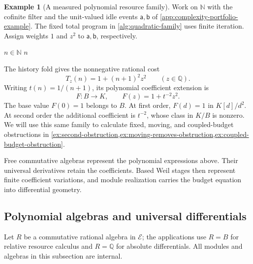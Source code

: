 \documentclass[11pt,a4paper]{article}
\numberwithin{algorithm}{section}
\numberwithin{equation}{section}
\theoremstyle{definition}
\newtheorem{example}[example]{Example}
\theoremstyle{remark}
\theoremstyle{plain}
\newcommand{\E}{\mathcal E}
\newcommand{\N}{\mathbb N}
\newcommand{\QQ}{\mathbb Q}
\theoremstyle{definition}
\theoremstyle{plain}
\begin{document}
\begin{example}[A measured polynomial resource family]
\label{ex:weighted-resource-family}
Work on $\N$ with the cofinite filter and the unit-valued idle events
$\mathsf a,\mathsf b$ of \cref{app:complexity-portfolio-example}.
The fixed total program in \cref{alg:quadratic-family} uses finite
iteration. Assign weights $1$ and $z^2$ to $\mathsf a,\mathsf b$,
respectively.
\begin{algorithm}[H]
\caption{The measured quadratic resource family}\label{alg:quadratic-family}
\small
\begin{algorithmic}[1]
\Require $n\in\N$
\State {}
  \State {}
\EndFor
\State \Return $n$
\end{algorithmic}
\end{algorithm}
The history fold gives the nonnegative rational cost
\[
 T_z(n)=1+(n+1)^2z^2\qquad(z\in\QQ).
\]
Writing $t(n)=1/(n+1)$, its polynomial coefficient extension is
\begin{equation}\label{eq:running-resource-family}
 F:B\longrightarrow K,\qquad F(z)=1+t^{-2}z^2.
\end{equation}
The base value $F(0)=1$ belongs to $B$. At first order,
$F(d)=1$ in $K[d]/d^2$. At second order the additional coefficient
is $t^{-2}$, whose class in $K/B$ is nonzero. We will use this same
family to calculate fixed, moving, and coupled-budget obstructions in
\cref{ex:second-obstruction,ex:moving-removes-obstruction,ex:coupled-budget-obstruction}.
\end{example}

Free commutative algebras represent the polynomial expressions above.
Their universal derivatives retain the coefficients. Based Weil
stages then represent finite coefficient variations, and module
realization carries the budget equation into differential geometry.

\subsection{Polynomial algebras and universal differentials}
\label{sec:differential}
Let $R$ be a commutative rational algebra in $\E$; the applications
use $R=B$ for relative resource calculus and $R=\QQ$ for absolute
differentials. All modules and algebras in this subsection are internal.
\end{document}
